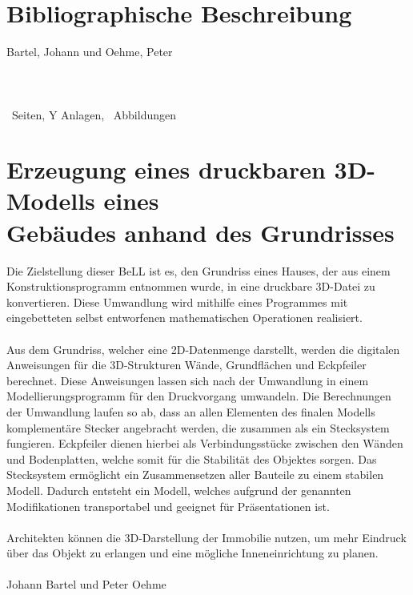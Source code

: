 \section*{Bibliographische Beschreibung}
Bartel, Johann und Oehme, Peter\\\\
\q{\docTitle}\\\\
  \theseitennr\ Seiten, Y Anlagen, \totalfigures\ Abbildungen
 
  \newpage
 
\section*{Erzeugung eines druckbaren 3D-Modells eines \\ Gebäudes anhand des Grundrisses}
Die Zielstellung dieser BeLL ist es, den Grundriss eines Hauses, der aus einem Konstruktionsprogramm entnommen wurde, in eine druckbare 3D-Datei zu konvertieren.
Diese Umwandlung wird mithilfe eines Programmes mit eingebetteten selbst entworfenen mathematischen Operationen realisiert.\\\\
Aus dem Grundriss, welcher eine 2D-Datenmenge darstellt, werden die digitalen Anweisungen für die 3D-Strukturen Wände, Grundflächen und \mbox{Eckpfeiler} berechnet. 
Diese Anweisungen lassen sich nach der Umwandlung in einem Modellierungsprogramm für den Druckvorgang umwandeln.
Die Berechnungen der Umwandlung laufen so ab, dass an allen Elementen des finalen Modells komplementäre Stecker angebracht werden, die zusammen als ein Stecksystem fungieren. 
Eckpfeiler dienen hierbei als Verbindungsstücke zwischen den Wänden und Bodenplatten, welche somit für die Stabilität des Objektes  sorgen. 
Das Stecksystem ermöglicht ein Zusammensetzen aller Bauteile zu einem stabilen Modell. 
Dadurch entsteht ein Modell, welches aufgrund der genannten Modifikationen transportabel und geeignet für Präsentationen ist.\\\\
Architekten können die 3D-Darstellung der Immobilie  nutzen, um mehr Eindruck über das Objekt zu erlangen und eine mögliche Inneneinrichtung zu planen.\\\\
Johann Bartel und Peter Oehme
